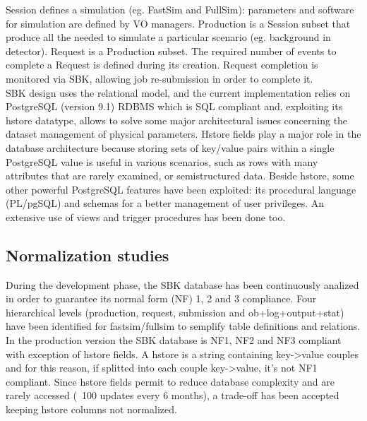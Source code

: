 \documentclass[journal]{IEEEtran}
\begin{document}
Session defines a simulation (eg. FastSim and FullSim): parameters and software for simulation are defined by VO managers. Production is a Session subset that produce all the  needed to simulate a particular scenario (eg. background in detector).
Request is a Production subset. The required number of events to complete a Request is defined during its creation. Request completion is monitored via SBK, allowing job re-submission in order to complete it.\\
SBK design uses the relational model, and the current implementation relies on PostgreSQL (version 9.1) RDBMS which is SQL compliant and, exploiting its hstore datatype, allows to solve some major architectural issues concerning the dataset management of physical parameters. Hstore fields play a major role in the database architecture because storing sets of key/value pairs within a single PostgreSQL value is useful in various scenarios, such as rows with many attributes that are rarely examined, or semistructured data. Beside hstore, some other powerful PostgreSQL features have been exploited: its procedural language (PL/pgSQL) and schemas for a better management of user privileges. An extensive use of views and trigger procedures has been done too.

\subsection{Normalization studies}
During the development phase, the SBK database has been continuously analized in order to guarantee its normal form (NF) 1, 2 and 3 compliance. Four hierarchical levels (production, request, submission and ob+log+output+stat) have been identified for fastsim/fullsim to semplify table definitions and relations. In the production version the SBK database is NF1, NF2 and NF3 compliant with exception of hstore fields. A hstore is a string containing key->value couples and for this reason, if splitted into each couple key->value, it's not NF1 compliant. Since hstore fields permit to reduce database complexity and are rarely accessed (~100 updates every 6 months), a trade-off has been accepted keeping hstore columns not normalized.
\end{document}
